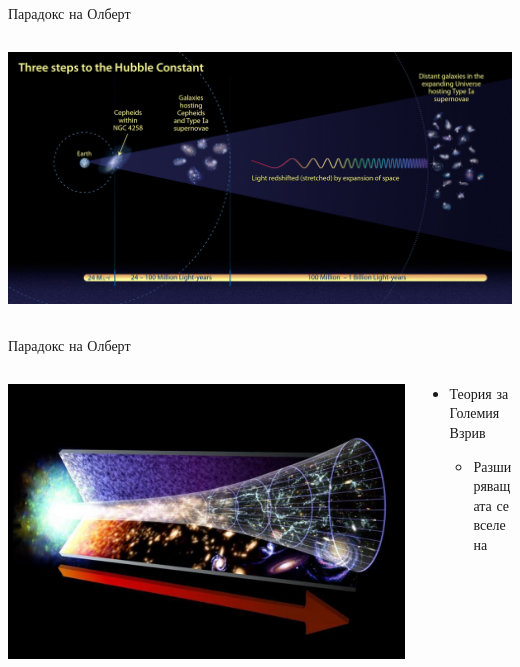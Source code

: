 \documentclass[10pt,a4paper]{beamer}
\begin{document}
        \begin{frame}{ Парадокс на Олберт }
            \begin{columns}
                \begin{column}{1\textwidth}
                    \includegraphics[width=\textwidth]{images/gr_olbert_resolution.jpg}
                \end{column}
            \end{columns}
        \end{frame}
        
        \begin{frame}{ Парадокс на Олберт }
            \begin{columns}
                \begin{column}{0.5\textwidth}
                    \includegraphics[width=\textwidth]{images/big_bang_theory.jpeg}
                \end{column}
                \begin{column}{0.5\textwidth}
                    \begin{itemize}
                        \item Теория за Големия Взрив \begin{itemize}
                            \item Разширяващата се вселена
                        \end{itemize}
                    \end{itemize}
                \end{column}
            \end{columns}
        \end{frame}
    
\end{document}
